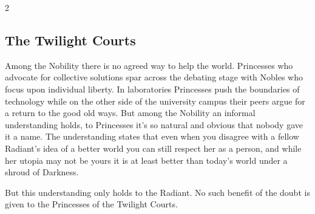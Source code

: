 \begin{multicols}{2}

\subsection*{The Twilight Courts}

Among the Nobility there is no agreed way to help the world. Princesses who advocate for collective solutions spar across the debating stage with Nobles who focus upon individual liberty. In laboratories Princesses push the boundaries of technology while on the other side of the university campus their peers argue for a return to the good old ways. But among the Nobility an informal understanding holds, to Princesses it's so natural and obvious that nobody gave it a name. The understanding states that even when you disagree with a fellow Radiant's idea of a better world you can still respect her as a person, and while her utopia may not be yours it is at least better than today's world under a shroud of Darkness. 

But this understanding only holds to the Radiant. No such benefit of the doubt is given to the Princesses of the Twilight Courts. 


\end{multicols}

